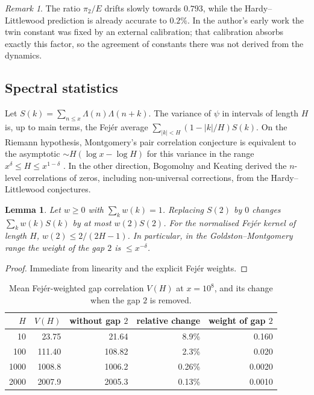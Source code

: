 \documentclass[11pt]{amsart}
\newtheorem{lemma}[theorem]{Lemma}
\theoremstyle{definition}
\theoremstyle{remark}
\newtheorem{remark}[theorem]{Remark}
\begin{document}
\begin{remark}
The ratio $\pi_2/E$ drifts slowly towards $0.793$, while the Hardy--Littlewood prediction is already accurate to $0.2\%$. In the author's early work the twin constant was fixed by an external calibration; that calibration absorbs exactly this factor, so the agreement of constants there was not derived from the dynamics.
\end{remark}

\subsection{Spectral statistics}
Let $S(k)=\sum_{n\le x}\Lambda(n)\Lambda(n+k)$. The variance of $\psi$ in intervals of length $H$ is, up to main terms, the Fejér average $\sum_{|k|<H}(1-|k|/H)S(k)$. On the Riemann hypothesis, Montgomery's pair correlation conjecture \cite{Mon73} is equivalent to the asymptotic $\sim H(\log x-\log H)$ for this variance in the range $x^\delta\le H\le x^{1-\delta}$ \cite{GM87}. In the other direction, Bogomolny and Keating \cite{BK96} derived the $n$-level correlations of zeros, including non-universal corrections, from the Hardy--Littlewood conjectures.

\begin{lemma}\label{lem:fejer}
Let $w\ge0$ with $\sum_kw(k)=1$. Replacing $S(2)$ by $0$ changes $\sum_kw(k)S(k)$ by at most $w(2)S(2)$. For the normalised Fejér kernel of length $H$, $w(2)\le2/(2H-1)$. In particular, in the Goldston--Montgomery range the weight of the gap $2$ is $\le x^{-\delta}$.
\end{lemma}

\begin{proof}
Immediate from linearity and the explicit Fejér weights.
\end{proof}

\begin{table}[h]
\centering\small
\caption{Mean Fejér-weighted gap correlation $V(H)$ at $x=10^8$, and its change when the gap $2$ is removed.}\label{tab:fejer}
\begin{tabular}{rrrrr}
\toprule
$H$ & $V(H)$ & without gap $2$ & relative change & weight of gap $2$\\
\midrule
10 & 23.75 & 21.64 & 8.9\% & 0.160\\
100 & 111.40 & 108.82 & 2.3\% & 0.020\\
1000 & 1008.8 & 1006.2 & 0.26\% & 0.0020\\
2000 & 2007.9 & 2005.3 & 0.13\% & 0.0010\\
\bottomrule
\end{tabular}
\end{table}
\end{document}
